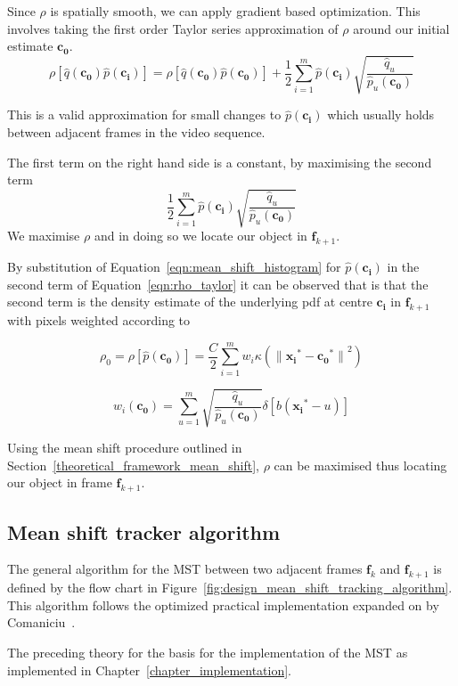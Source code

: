 Since $\rho$ is spatially smooth, we can apply gradient based optimization. This involves
taking the first order Taylor series approximation of $\rho$ around our initial
estimate $\mathbf{c_0}$. 
\begin{equation}\label{eqn:rho_taylor}
    \rho[\hat{q}(\mathbf{c_0})\hat{p}(\mathbf{c_i})]=\rho[\hat{q}(\mathbf{c_0})\hat{p}(\mathbf{c_0})]+\frac{1}{2}\sum_{i=1}^{m}\hat{p}(\mathbf{c_i})\sqrt{\frac{\hat{q}_u}{\hat{p}_u(\mathbf{c_0})}}
\end{equation}

This is a valid approximation for small changes to $\hat{p}(\mathbf{c_i})$
which usually holds between adjacent frames in the video sequence. 

The first term on the right hand side is a constant, by maximising the second
term 
\[\frac{1}{2}\sum_{i=1}^{m}\hat{p}(\mathbf{c_i})\sqrt{\frac{\hat{q}_u}{\hat{p}_u(\mathbf{c_0})}}\]
We maximise $\rho$ and in doing so we locate our object in $\mathbf{f}_{k+1}$.

By substitution of Equation~\ref{eqn:mean_shift_histogram} for $\hat{p}(\mathbf{c_i})$ in
the second term of Equation~\ref{eqn:rho_taylor} it can be observed that is that the
second term is the density estimate of the underlying pdf at centre
$\mathbf{c_i}$ in $\mathbf{f}_{k+1}$ with pixels weighted according to

\[\rho_0=\rho[\hat{p}(\mathbf{c_0})]=\frac{C}{2}\sum_{i=1}^{m}w_i\kappa({\parallel{\mathbf{x_i}^*}-{\mathbf{c_0}^*}\parallel}^2)\]

\begin{equation}\label{eqn:mean_shift_weights}
    w_i(\mathbf{c_0})=\sum_{u=1}^{m}\sqrt{\frac{\hat{q}_u}{\hat{p}_u(\mathbf{c_0})}}\delta[b(\mathbf{x_i}^*-u)]
\end{equation}

Using the mean shift procedure outlined in
Section~\ref{theoretical_framework_mean_shift}, $\rho$ can be maximised thus
locating our object in frame $\mathbf{f}_{k+1}$.

\subsection{Mean shift tracker algorithm}\label{theoretical_framework_mean_shift_algorithm}
The general algorithm for the MST between two adjacent frames $\mathbf{f}_k$ and
$\mathbf{f}_{k+1}$ is defined by the flow chart in
Figure~\ref{fig:design_mean_shift_tracking_algorithm}. This algorithm follows
the optimized practical implementation expanded on by
Comaniciu~\cite{Comaniciu2003}. 


The preceding theory for the basis for the implementation of the MST as implemented in Chapter~\ref{chapter_implementation}.
